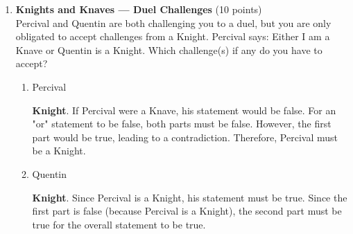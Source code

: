 \begin{enumerate}
  \item \textbf{Knights and Knaves --- Duel Challenges} (10 points)\\
  Percival and Quentin are both challenging you to a duel, but you are only obligated to accept challenges from a Knight. Percival says: Either I am a Knave or Quentin is a Knight. Which challenge(s) if any do you have to accept?
  \begin{enumerate}[label=\arabic*.]
    \item Percival\\
    \begin{subanswer}
      \textbf{Knight}. If Percival were a Knave, his statement  would be false. For an "or" statement to be false, both parts must be false. However, the first part  would be true, leading to a contradiction. Therefore, Percival must be a Knight.
    \end{subanswer}
    \item Quentin\\
    \begin{subanswer}
      \textbf{Knight}. Since Percival is a Knight, his statement  must be true. Since the first part  is false (because Percival is a Knight), the second part  must be true for the overall statement to be true.
    \end{subanswer}
  \end{enumerate}


\end{enumerate}
